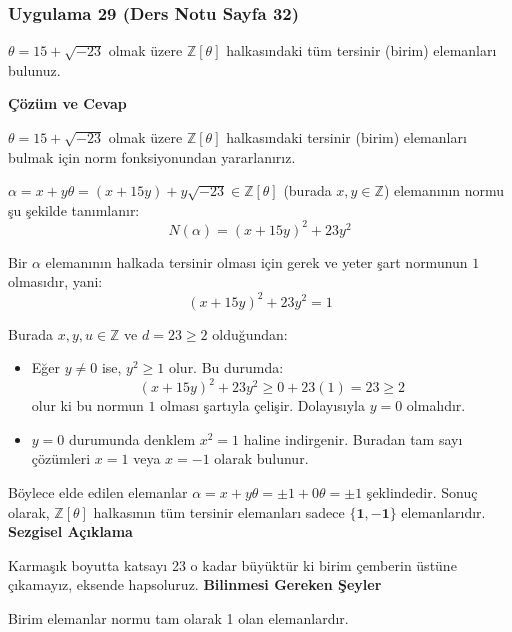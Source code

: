 \documentclass[11pt, a4paper]{article}
\newenvironment{cozum}{
    \vspace{0.5cm}
    \noindent\textcolor{green!60!black}{\faCheckCircle\enspace \textbf{\Large Çözüm ve Cevap}}\par\vspace{0.2cm}
}{}
\newenvironment{sezgisel}{
    \vspace{0.5cm}
    \noindent\textcolor{orange!80!black}{\faLightbulb\enspace \textbf{\Large Sezgisel Açıklama}}\par\vspace{0.2cm}
    \itshape
}{}
\newenvironment{bilgi}{
    \vspace{0.5cm}
    \noindent\textcolor{red!70!black}{\faExclamationTriangle\enspace \textbf{\Large Bilinmesi Gereken Şeyler}}\par\vspace{0.2cm}
}{}
\begin{document}
\subsubsection{Uygulama 29 (Ders Notu Sayfa 32)}
\begin{sorubox}
$\theta = 15 + \sqrt{-23}$ olmak üzere $\mathbb{Z}[\theta]$ halkasındaki tüm tersinir (birim) elemanları bulunuz.
\end{sorubox}
\begin{cozum}
$\theta = 15 + \sqrt{-23}$ olmak üzere $\mathbb{Z}[\theta]$ halkasındaki tersinir (birim) elemanları bulmak için norm fonksiyonundan yararlanırız.

$\alpha = x + y\theta = (x + 15y) + y\sqrt{-23} \in \mathbb{Z}[\theta]$ (burada $x, y \in \mathbb{Z}$) elemanının normu şu şekilde tanımlanır:
\[ N(\alpha) = (x + 15y)^2 + 23 y^2 \]

Bir $\alpha$ elemanının halkada tersinir olması için gerek ve yeter şart normunun $1$ olmasıdır, yani:
\[ (x + 15y)^2 + 23 y^2 = 1 \]

Burada $x, y, u \in \mathbb{Z}$ ve $d = 23 \ge 2$ olduğundan:
\begin{itemize}
    \item Eğer $y \neq 0$ ise, $y^2 \ge 1$ olur. Bu durumda:
    \[ (x + 15y)^2 + 23 y^2 \ge 0 + 23(1) = 23 \ge 2 \]
    olur ki bu normun $1$ olması şartıyla çelişir. Dolayısıyla $y = 0$ olmalıdır.
    \item $y = 0$ durumunda denklem $x^2 = 1$ haline indirgenir. Buradan tam sayı çözümleri $x = 1$ veya $x = -1$ olarak bulunur.
\end{itemize}

Böylece elde edilen elemanlar $\alpha = x + y\theta = \pm 1 + 0\theta = \pm 1$ şeklindedir. Sonuç olarak, $\mathbb{Z}[\theta]$ halkasının tüm tersinir elemanları sadece $\mathbf{\{1, -1\}}$ elemanlarıdır.
\end{cozum}
\begin{sezgisel}
Karmaşık boyutta katsayı 23 o kadar büyüktür ki birim çemberin üstüne çıkamayız, eksende hapsoluruz.
\end{sezgisel}
\begin{bilgi}
Birim elemanlar normu tam olarak 1 olan elemanlardır.
\end{bilgi}

\newpage
\end{document}
